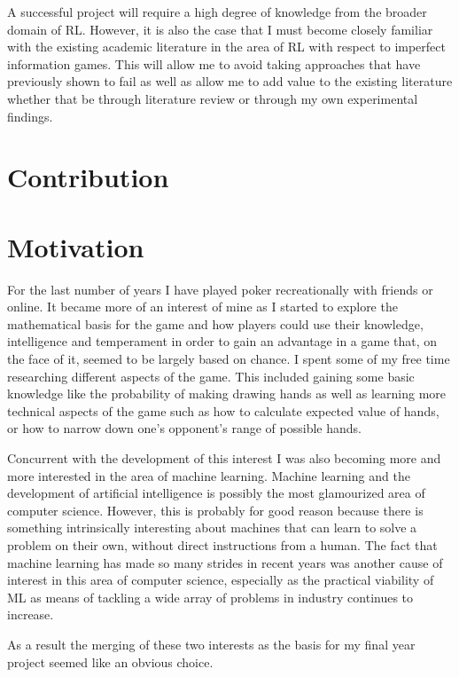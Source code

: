 A successful project will require a high degree of knowledge from the broader domain of RL. However, it is also the case
that I must become closely familiar with the existing academic literature in the area of RL with respect to imperfect
information games.
This will allow me to avoid taking approaches that have previously shown to fail as well as allow me to add value to
the existing literature whether that be through literature review or through my own experimental findings.


\section{Contribution}\label{sec:contribution}

\section{Motivation}\label{sec:Motivation}
For the last number of years I have played poker recreationally with friends or online.
It became more of an interest of mine as I started to explore the mathematical basis for the game and how
players could use their knowledge, intelligence and temperament in order to gain an advantage in a game that,
on the face of it, seemed to be largely based on chance.
I spent some of my free time researching different aspects of the game.
This included gaining some basic knowledge like the probability of making drawing hands as well as learning more
technical aspects of the game such as how to calculate expected value of hands,
or how to narrow down one's opponent's range of possible hands.

Concurrent with the development of this interest I was also becoming more and more interested in the area
of machine learning.
Machine learning and the development of artificial intelligence is possibly the most glamourized area
of computer science.
However, this is probably for good reason because there is something intrinsically interesting
about machines that can learn to solve a problem on their own, without direct instructions from a human.
The fact that machine learning has made so many strides in recent years was another cause of interest in
this area of computer science, especially as the practical viability of ML as means of tackling a wide array
of problems in industry continues to increase.

As a result the merging of these two interests as the basis for my final year project seemed like an obvious choice.
